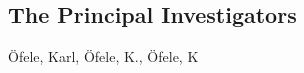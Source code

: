 \documentclass[guidance]{erc-B2}
\begin{document}

\begin{objectives}
  \label{sec:objectives}
\end{objectives}

\begin{methodology}
\label{sec:research}

\end{methodology}

\begin{resources}
\label{sec:resources}
\subsection{The Principal Investigators}
\end{resources}

\forcsvlist{\listadd\boldnames}
           {{{\"{O}}fele, Karl}, {{\"{O}}fele, K.}, {{\"{O}}fele, K\bibinitperio}}

\begin{ongoing grants and applications}
\label{sec:ongoing}

\end{ongoing grants and applications}
\end{document}
